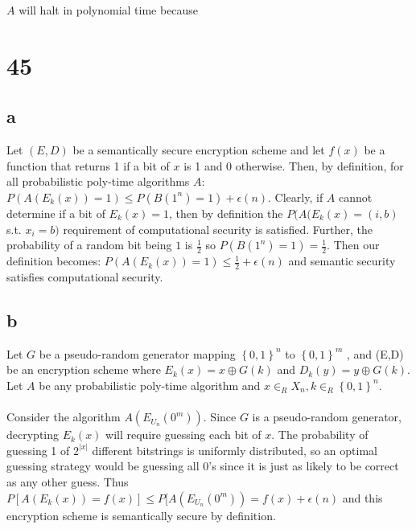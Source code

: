 \documentclass[letterpaper,notitlepage,twoside]{article}
\begin{document}
$A$ will halt in polynomial time because \\

\section*{45}
\subsection*{a}
Let $(E, D)$ be a semantically secure encryption scheme and let $f(x)$ be a function that returns 1 if a bit of $x$ is 1 and 0 otherwise.
Then, by definition, for all probabilistic poly-time algorithms $A$: $P(A(E_k(x)) = 1) \leq P(B(1^{n}) = 1) + \epsilon(n)$.
Clearly, if $A$ cannot determine if a bit of $E_k(x) = 1$, then by definition the $P(A(E_k(x) = (i,b)$ s.t. $x_i = b)$ requirement of computational security is satisfied. 
Further, the probability of a random bit being $1$ is $\frac{1}{2}$ so $P(B(1^{n}) = 1) = \frac{1}{2}$. 
Then our definition becomes: $P(A(E_k(x)) = 1) \leq \frac{1}{2} + \epsilon(n)$ and semantic security satisfies computational security.

\subsection*{b}
Let $G$ be a pseudo-random generator mapping $\left\{0, 1\right\}^n$ to $\left\{0, 1\right\}^m$ , and (E,D) be an encryption scheme where $E_k(x) = x \oplus G(k)$ and $D_k(y) = y \oplus G(k)$. Let $A$ be any probabilistic poly-time algorithm and $x \in_R X_n,k \in_R \left\{0,1\right\}^n$.
\\\\
Consider the algorithm $A(E_{U_n}(0^m))$. Since $G$ is a pseudo-random generator, decrypting $E_k(x)$ will require guessing each bit of $x$. The probability of guessing 1 of $2^{|x|}$ different bitstrings is uniformly distributed, so an optimal guessing strategy would be guessing all 0's since it is just as likely to be correct as any other guess. Thus $P[A(E_k(x))=f(x)] \le P[A(E_{U_n}(0^m)) = f(x) + \epsilon(n)$ and this encryption scheme is semantically secure by definition.
\end{document}
